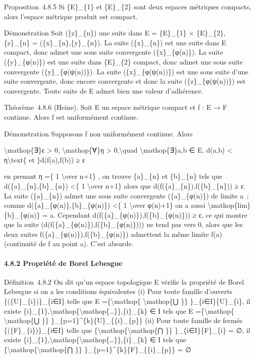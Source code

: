 \documentclass[]{article}
\begin{document}
Proposition~4.8.5 Si \{E\}\_\{1\} et \{E\}\_\{2\} sont deux espaces
métriques compacts, alors l'espace métrique produit est compact.

Démonstration Soit (\{z\}\_\{n\}) une suite dans E = \{E\}\_\{1\} ×
\{E\}\_\{2\}, \{z\}\_\{n\} = (\{x\}\_\{n\},\{y\}\_\{n\}). La suite
(\{x\}\_\{n\}) est une suite dans E compact, donc admet une sous suite
convergente (\{x\}\_\{φ(n)\}). La suite (\{y\}\_\{φ(n)\}) est une suite
dans \{E\}\_\{2\} compact, donc admet une sous suite convergente
(\{y\}\_\{φ(ψ(n))\}). La suite (\{x\}\_\{φ(ψ(n))\}) est une sous suite
d'une suite convergente, donc encore convergente et donc la suite
(\{z\}\_\{φ(ψ(n))\}) est convergente. Toute suite de E admet bien une
valeur d'adhérence.

Théorème~4.8.6 (Heine). Soit E un espace métrique compact et f : E → F
continue. Alors f est uniformément continue.

Démonstration Supposons f non uniformément continue. Alors

\textbackslash{}mathop\{∃\}ε \textgreater{} 0,
\textbackslash{}mathop\{∀\}η \textgreater{} 0,\textbackslash{}quad
\textbackslash{}mathop\{∃\}a,b ∈ E, d(a,b) \textless{}
η\textbackslash{}text\{ et \}d(f(a),f(b)) ≥ ε

en prenant η =\{ 1 \textbackslash{}over n+1\} , on trouve \{a\}\_\{n\}
et \{b\}\_\{n\} tels que d(\{a\}\_\{n\},\{b\}\_\{n\}) \textless{}\{ 1
\textbackslash{}over n+1\} alors que d(f(\{a\}\_\{n\}),f(\{b\}\_\{n\}))
≥ ε. La suite (\{a\}\_\{n\}) admet une sous suite convergente
(\{a\}\_\{φ(n)\}) de limite a~; comme d(\{a\}\_\{φ(n)\},\{b\}\_\{φ(n)\})
\textless{}\{ 1 \textbackslash{}over φ(n)+1\} on a aussi
\textbackslash{}mathop\{lim\}\{b\}\_\{φ(n)\} = a. Cependant
d(f(\{a\}\_\{φ(n)\}),f(\{b\}\_\{φ(n)\})) ≥ ε, ce qui montre que la suite
(d(f(\{a\}\_\{φ(n)\}),f(\{b\}\_\{φ(n)\}))) ne tend pas vers 0, alors que
les deux suites f(\{a\}\_\{φ(n)\}),f(\{b\}\_\{φ(n)\}) admettent la même
limite f(a) (continuité de f au point a). C'est absurde.

\paragraph{4.8.2 Propriété de Borel Lebesgue}

Définition~4.8.2 On dit qu'un espace topologique E vérifie la propriété
de Borel Lebesgue si on a les conditions équivalentes (i) Pour toute
famille d'ouverts \{(\{U\}\_\{i\})\}\_\{i∈I\} telle que E
=\{\textbackslash{}mathop\{ \textbackslash{}mathop\{⋃ \}\}
\}\_\{i∈I\}\{U\}\_\{i\}, il existe
\{i\}\_\{1\},\textbackslash{}mathop\{\textbackslash{}mathop\{\ldots{}\}\},\{i\}\_\{k\}
∈ I tels que E =\{\textbackslash{}mathop\{ \textbackslash{}mathop\{⋃
\}\} \}\_\{p=1\}\^{}\{k\}\{U\}\_\{\{i\}\_\{p\}\} (ii) Pour toute famille
de fermés \{(\{F\}\_\{i\})\}\_\{i∈I\} telle que
\{\textbackslash{}mathop\{\textbackslash{}mathop\{⋂ \}\}
\}\_\{i∈I\}\{F\}\_\{i\} = ∅, il existe
\{i\}\_\{1\},\textbackslash{}mathop\{\textbackslash{}mathop\{\ldots{}\}\},\{i\}\_\{k\}
∈ I tels que \{\textbackslash{}mathop\{\textbackslash{}mathop\{⋂ \}\}
\}\_\{p=1\}\^{}\{k\}\{F\}\_\{\{i\}\_\{p\}\} = ∅
\end{document}
